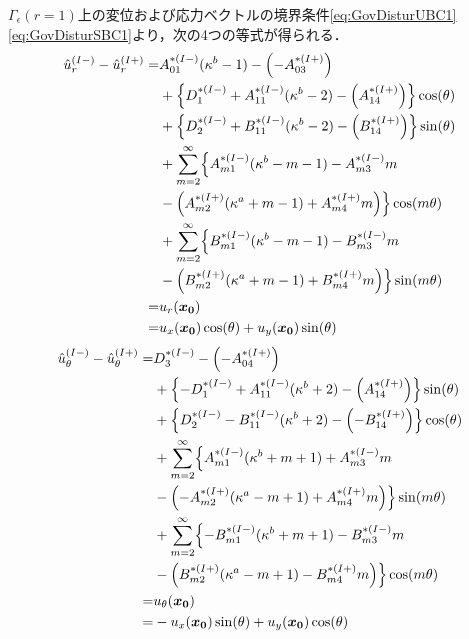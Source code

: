 $\Gamma_{\epsilon}(r=1)$上の変位および応力ベクトルの境界条件\eqref{eq:GovDisturUBC1}\eqref{eq:GovDisturSBC1}より，次の4つの等式が得られる．
\begin{align}
	\hat{u}_{r}^{(I-)}-\hat{u}_{r}^{(I+)} =&A_{01}^{*(I-)}(\kappa^{b}-1)-\Bigl(-A_{03}^{*(I+)}\Bigr)
	\nonumber
	\\
	&+\Bigl\{D_{1}^{*(I-)}+A_{11}^{*(I-)}(\kappa^{b}-2)
	-\Bigl(A_{14}^{*(I+)}\Bigr)\Bigr\}\cos(\theta)
	\nonumber
	\\
	&+\Bigl\{D_{2}^{*(I-)}+B_{11}^{*(I-)}(\kappa^{b}-2)
	-\Bigl(B_{14}^{*(I+)}\Bigr)\Bigr\}\sin(\theta)
	\nonumber
	\\
	&+\sum_{m=2}^{\infty}\Bigl\{A_{m1}^{*(I-)}(\kappa^{b}-m-1)
	-A_{m3}^{*(I-)}m
	\nonumber
	\\
	&-\Bigl(A_{m2}^{*(I+)}(\kappa^{a}+m-1)
	+A_{m4}^{*(I+)}m\Bigr)\Bigr\}\cos(m\theta)
	\nonumber
	\\
	&+\sum_{m=2}^{\infty}\Bigl\{B_{m1}^{*(I-)}(\kappa^{b}-m-1)
	-B_{m3}^{*(I-)}m
	\nonumber
	\\
	&-\Bigl(B_{m2}^{*(I+)}(\kappa^{a}+m-1)
	+B_{m4}^{*(I+)}m\Bigr)\Bigr\}\sin(m\theta)
	\nonumber
	\\
	=&u_{r}(\bm{x_{0}})
	\nonumber
	\\
	=&u_{x}(\bm{x_{0}})\cos(\theta)+u_{y}(\bm{x_{0}})\sin(\theta)
	\label{eq:UR1eq}
\end{align}
\begin{align}
	\hat{u}_{\theta}^{(I-)}-\hat{u}_{\theta}^{(I+)} =&D_{3}^{*(I-)}-\Bigl(-A_{04}^{*(I+)}\Bigr)
	\nonumber
	\\
	&+\Bigl\{-D_{1}^{*(I-)}+A_{11}^{*(I-)}(\kappa^{b}+2)
	-\Bigl(A_{14}^{*(I+)}\Bigr)\Bigr\}\sin(\theta)
	\nonumber
	\\
	&+\Bigl\{D_{2}^{*(I-)}-B_{11}^{*(I-)}(\kappa^{b}+2)
	-\Bigl(-B_{14}^{*(I+)}\Bigr)\Bigr\}\cos(\theta)
	\nonumber
	\\
	&+\sum_{m=2}^{\infty}\Bigl\{A_{m1}^{*(I-)}(\kappa^{b}+m+1)
	+A_{m3}^{*(I-)}m
	\nonumber
	\\
	&-\Bigl(-A_{m2}^{*(I+)}(\kappa^{a}-m+1)
	+A_{m4}^{*(I+)}m\Bigr)\Bigr\}\sin(m\theta)
	\nonumber
	\\
	&+\sum_{m=2}^{\infty}\Bigl\{-B_{m1}^{*(I-)}(\kappa^{b}+m+1)
	-B_{m3}^{*(I-)}m
	\nonumber
	\\
	&-\Bigl(B_{m2}^{*(I+)}(\kappa^{a}-m+1)
	-B_{m4}^{*(I+)}m\Bigr)\Bigr\}\cos(m\theta)
	\nonumber
	\\
	=&u_{\theta}(\bm{x_{0}})
	\nonumber
	\\
	=&-u_{x}(\bm{x_{0}})\sin(\theta)+u_{y}(\bm{x_{0}})\cos(\theta)
	\label{eq:UTh1eq}
\end{align}
